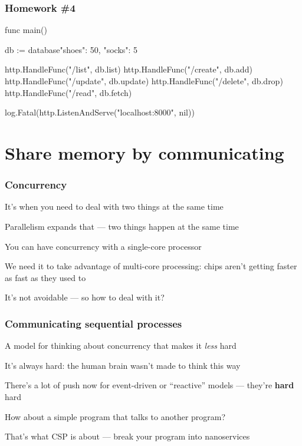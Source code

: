 \documentclass[handout,compress,t,11pt]{beamer}
\begin{document}
\begin{frame}[fragile]
    \frametitle{Homework \#4}
\begin{golang}
func main() {
	db := database{"shoes": 50, "socks": 5}

	http.HandleFunc("/list", db.list)
	http.HandleFunc("/create", db.add)
	http.HandleFunc("/update", db.update)
	http.HandleFunc("/delete", db.drop)
	http.HandleFunc("/read", db.fetch)

	log.Fatal(http.ListenAndServe("localhost:8000", nil))
}
\end{golang}
\end{frame}


\section{Share memory by communicating}
\begin{frame}[fragile]
    \frametitle{Concurrency}
    It's when you need to deal with two things at the same time \par
    \vspace{0.5\baselineskip}
   
    Parallelism expands that --- two things happen at the same time \par
    \vspace{2\baselineskip}
    You can have concurrency with a single-core processor \par
    \vspace{1.5\baselineskip}
    We need it to take advantage of multi-core processing: chips
    aren't getting faster as fast as they used to \par
    \vspace{2\baselineskip}
    It's not avoidable --- so how to deal with it?
\end{frame}

\begin{frame}[fragile]
    \frametitle{Communicating sequential processes}
    A model for thinking about concurrency that makes it {\em less} hard \par
    \vspace{\baselineskip}
    It's always hard: the human brain wasn't made to think this way \par
    \vspace{2\baselineskip}
    There's a lot of push now for event-driven or ``reactive'' models ---
    they're {\bf hard} hard \par
    \vspace{1.5\baselineskip}
    How about a simple program that talks to another program? \par
    \vspace{1.5\baselineskip}
    That's what CSP is about --- break your program into nanoservices
\end{frame}
\end{document}
